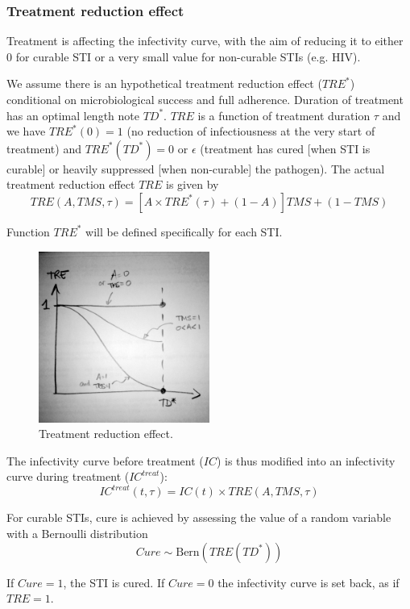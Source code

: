 \documentclass[11pt, onecolumn]{article}
\begin{document}
\subsubsection{Treatment reduction effect}

Treatment is affecting the infectivity curve, with the aim of reducing it to either 0 for curable STI or a very small value for non-curable STIs (e.g. HIV). 

We assume there is an hypothetical treatment reduction effect ($TRE^*$) conditional on microbiological success and full adherence. Duration of treatment has an optimal length note $TD^*$. $TRE$ is a function of treatment duration $\tau$ and we have $TRE^*(0)=1$ (no reduction of infectiousness at the very start of treatment) and $TRE^*(TD^*)=0$ or $\epsilon$ (treatment has cured [when STI is curable] or heavily suppressed [when non-curable] the pathogen). The actual treatment reduction effect $TRE$ is given by
$$TRE(A, TMS,\tau) = \left[A\times TRE^*(\tau) + (1-A) \right] TMS + (1-TMS) $$

Function $TRE^*$ will be defined specifically for each STI.

\begin{figure}[!ht]
\centering
    \includegraphics[angle=0,width=0.5\textwidth]{figures/TRE.JPG}
\caption{Treatment reduction effect.}
\label{fig:TRE}
\end{figure}

The infectivity curve before treatment ($IC$) is thus modified into an infectivity curve during treatment ($IC^{treat}$):
$$IC^{treat}(t,\tau)= IC(t)\times TRE(A,TMS,\tau)  $$

For curable STIs, cure is achieved by assessing the value of a random variable with a Bernoulli distribution 
$$Cure \sim \mathrm{Bern}(TRE(TD^*)) $$

If $Cure=1$, the STI is cured. If $Cure=0$ the infectivity curve is set back, as if $TRE=1$.
\end{document}
